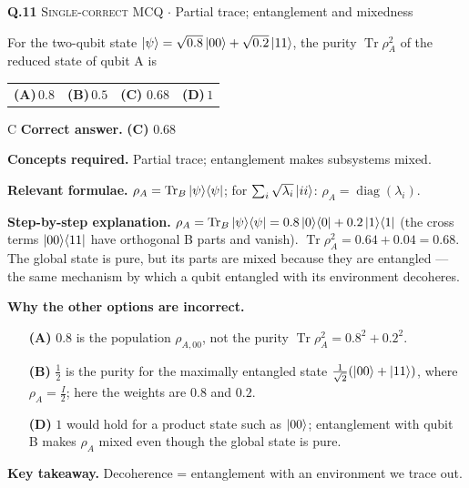 \documentclass[11pt,a4paper]{article}
\newcommand{\optlabel}[1]{\textbf{(#1)}}
\newcommand{\correctlabel}[1]{\textcolor{okgreen}{\textbf{(#1)}\,\ding{51}}}
\newenvironment{qitem}[1]{\begin{list}{}{\setlength{\leftmargin}{3.3em}\setlength{\labelwidth}{3.1em}%
  \setlength{\labelsep}{0.2em}\setlength{\topsep}{3pt}\setlength{\parsep}{3pt}}\item[\textbf{Q.#1}\hfill]}{\end{list}}
\newcommand{\qsep}{\par\vspace{2pt}{\color{black!15}\hrule}\vspace{4pt}}
\newcommand{\qmeta}[2]{{\footnotesize\color{black!60}\textsc{#1} \;$\cdot$\; #2}\par}
\begin{document}
\begin{qitem}{11}
\qmeta{Single-correct MCQ}{Partial trace; entanglement and mixedness}
For the two-qubit state $\ket\psi = \sqrt{0.8}\ket{00} + \sqrt{0.2}\ket{11}$, the purity $\operatorname{Tr}\rho_A^2$ of the reduced state of qubit A is
\par\smallskip\noindent\begin{tabularx}{\linewidth}{@{}*{4}{L}@{}}
\optlabel{A}\,$0.8$ & \optlabel{B}\,$0.5$ & \correctlabel{C}\,$0.68$ & \optlabel{D}\,$1$
\end{tabularx}
\end{qitem}
\begin{solbox}{C}
\textbf{\color{brand}Correct answer.} \textcolor{okgreen}{\textbf{(C)}} $0.68$

\textbf{\color{brand}Concepts required.} Partial trace; entanglement makes subsystems mixed.

\textbf{\color{brand}Relevant formulae.} $\rho_A = \operatorname{Tr}_B\ket\psi\!\bra\psi$; for $\sum_i\sqrt{\lambda_i}\ket{ii}$: $\rho_A = \operatorname{diag}(\lambda_i)$.

\textbf{\color{brand}Step-by-step explanation.} $\rho_A = \operatorname{Tr}_B\ket\psi\!\bra\psi = 0.8\ket0\!\bra0 + 0.2\ket1\!\bra1$ (the cross terms $\ket{00}\!\bra{11}$ have orthogonal B parts and vanish).
$\operatorname{Tr}\rho_A^2 = 0.64 + 0.04 = 0.68$. The global state is pure, but its parts are mixed because they are entangled ---
the same mechanism by which a qubit entangled with its environment decoheres.

\textbf{\color{brand}Why the other options are incorrect.}
\begin{itemize}[leftmargin=2.4em, itemsep=1pt, topsep=2pt]
\item[\textbf{(A)}] $0.8$ is the population $\rho_{A,00}$, not the purity $\operatorname{Tr}\rho_A^2 = 0.8^2 + 0.2^2$.
\item[\textbf{(B)}] $\frac12$ is the purity for the maximally entangled state $\frac{1}{\sqrt2}(\ket{00} + \ket{11})$, where $\rho_A = \frac I2$; here the weights are $0.8$ and $0.2$.
\item[\textbf{(D)}] $1$ would hold for a product state such as $\ket{00}$; entanglement with qubit B makes $\rho_A$ mixed even though the global state is pure.
\end{itemize}
\textbf{\color{brand}Key takeaway.} Decoherence = entanglement with an environment we trace out.
\end{solbox}
\qsep
\end{document}
